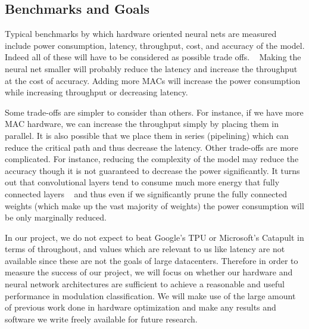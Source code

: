 \subsection{Benchmarks and Goals}
Typical benchmarks by which hardware oriented neural nets are measured include power consumption, latency, throughput, cost, and accuracy of the model.  Indeed all of these will have to be considered as possible trade offs. ~\cite{DBLP:journals/corr/SzeCYE17} Making the neural net smaller will probably reduce the latency and increase the throughput at the cost of accuracy.  Adding more MACs will increase the power consumption while increasing throughput or decreasing latency.

Some trade-offs are simpler to consider than others.  For instance, if we have more MAC hardware, we can increase the throughput simply by placing them in parallel.  It is also possible that we place them in series (pipelining) which can reduce the critical path and thus decrease the latency.  Other trade-offs are more complicated.  For instance, reducing the complexity of the model may reduce the accuracy though it is not guaranteed to decrease the power significantly.  It turns out that convolutional layers tend to consume much more energy that fully connected layers ~\cite{Chen:2016:ESA:3001136.3001177} and thus even if we significantly prune the fully connected weights (which make up the vast majority of weights) the power consumption will be only marginally reduced.

In our project, we do not expect to beat Google's TPU or Microsoft's Catapult in terms of throughout, and values which are relevant to us like latency are not available since these are not the goals of large datacenters.  Therefore in order to measure the success of our project, we will focus on whether our hardware and neural network architectures are sufficient to achieve a reasonable and useful performance in modulation classification.  We will make use of the large amount of previous work done in hardware optimization and make any results and software we write freely available for future research.
